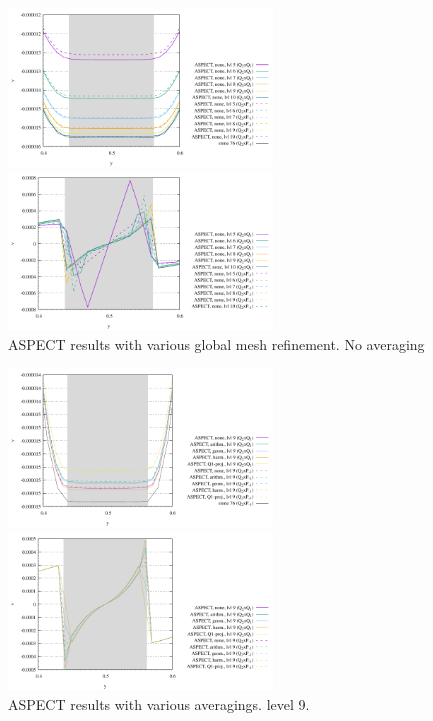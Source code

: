 \begin{center}
\includegraphics[width=7cm]{images/sinking_block/v_FS_ASPECT_56789}
\includegraphics[width=7cm]{images/sinking_block/pressure_FS_ASPECT_56789}\\
{\captionfont ASPECT results with various global mesh refinement. No averaging}
\end{center}

\begin{center}
\includegraphics[width=7cm]{images/sinking_block/v_FS_ASPECT_avrg}
\includegraphics[width=7cm]{images/sinking_block/pressure_FS_ASPECT_avrg}\\
{\captionfont ASPECT results with various averagings. level 9.}
\end{center}



